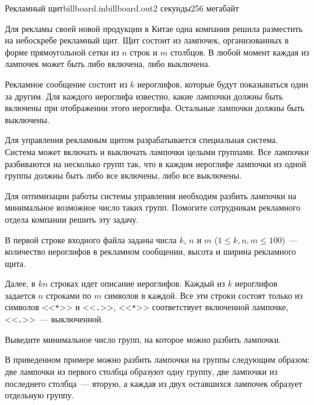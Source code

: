 \begin{problem}{Рекламный щит}{billboard.in}{billboard.out}{2 секунды}{256 мегабайт}


Для рекламы своей новой продукции в Китае одна компания решила разместить
на небоскребе рекламный щит. Щит состоит из лампочек, организованных в форме
прямоугольной сетки из $n$ строк и $m$ столбцов. В любой момент каждая
из лампочек может быть либо включена, либо выключена.

Рекламное сообщение состоит из $k$ иероглифов, которые будут показываться
один за другим. Для каждого иероглифа известно, какие лампочки должны быть 
включены при отображении этого иероглифа. Остальные лампочки должны быть выключены.

Для управления рекламным щитом разрабатывается специальная система.
Система может включать и выключать лампочки целыми группами.
Все лампочки разбиваются на несколько групп так, что
в каждом иероглифе лампочки из одной группы должны быть либо 
все включены, либо все выключены.

Для оптимизации работы системы управления необходим разбить лампочки на
минимальное возможное число таких групп. Помогите сотрудникам рекламного
отдела компании решить эту задачу.

\InputFile
В первой строке входного файла заданы числа $k$, $n$ и $m$ ($1 \le k, n, m \le 100$)~--- 
количество иероглифов в рекламном сообщении, высота и ширина рекламного щита. 

Далее, в $kn$ строках идет описание иероглифов. Каждый из $k$ иероглифов задается $n$ строками
по $m$ символов в каждой. Все эти строки состоят только из символов <<\texttt{*}>> и
<<\texttt{.}>>, <<\texttt{*}>> соответствует включенной лампочке, <<\texttt{.}>>~--- выключенной.

\OutputFile
Выведите минимальное число групп, на которое можно разбить лампочки.

\Example

\begin{example}%
%
\end{example}

\bigskip

В приведенном примере можно разбить лампочки на группы следующим образом: две лампочки из первого столбца 
образуют одну группу, две лампочки из последнего столбца~--- вторую, а каждая из двух оставшихся лампочек
образует отдельную группу.

\end{problem}
